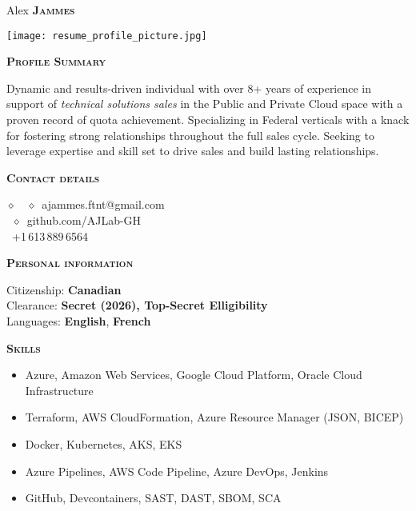 \documentclass[11pt, a4paper]{article}
\newcommand{\small}[1]{{\small$\diamond$\ #1}}
\newcommand{\headleft}[1]{\vspace*{3ex}\textsc{\textbf{#1}}\par%
    \vspace*{-1.5ex}\hrulefill\par\vspace*{0.7ex}}
\begin{document}
\setlength{\topskip}{0pt}
\setlength{\parindent}{0pt}
\setlength{\parskip}{0pt}
\setlength{\fboxsep}{0pt}
\pagestyle{empty}
\raggedbottom

\begin{minipage}[t]{0.28\textwidth} %
\colorbox{cvblue}{\begin{minipage}[t][5mm][t]{\textwidth}\null\hfill\null\end{minipage}}

\vspace{-.2ex} %
\colorbox{cvblue!90}{\color{white}  %
\textwidth\relax%
\begin{minipage}[t][293mm][t]{0.82\textwidth}
\raggedright
\vspace*{2.5ex}

\Large Alex \textbf{\textsc{Jammes}} \normalsize

\null\hfill\texttt{[image: resume\_profile\_picture.jpg]}\hfill\null

\vspace*{0.5ex} %

\headleft{Profile Summary}
Dynamic and results-driven individual with over 8+ years of experience in support of \textit{ technical solutions sales} in the Public and Private Cloud space with a proven record of quota achievement. Specializing in Federal verticals with a knack for fostering strong relationships throughout the full sales cycle. Seeking to leverage expertise and skill set to drive sales and build lasting relationships.

\headleft{Contact details}
\small %
\MVAt\ {\small ajammes.ftnt@gmail.com} \\[0.4ex]
\faGithub\ {\small github.com/AJLab-GH}\\[0.2ex]
\Mobilefone\ +1\,613\,889\,6564\,\\

\normalsize

\headleft{Personal information}
Citizenship: \textbf{Canadian} \\[0.5ex]
Clearance: \textbf{Secret (2026), Top-Secret Elligibility} \\[0.5ex]
Languages: \textbf{English}, \textbf{French}

\headleft{Skills}
\begin{itemize}
\item Azure, Amazon Web Services, Google Cloud Platform, Oracle Cloud Infrastructure
\item Terraform, AWS CloudFormation, Azure Resource Manager (JSON, BICEP)
\item Docker, Kubernetes, AKS, EKS
\item Azure Pipelines, AWS Code Pipeline, Azure DevOps, Jenkins
\item GitHub, Devcontainers, SAST, DAST, SBOM, SCA
\end{itemize}


\end{minipage}}
\end{minipage}
\end{document}
